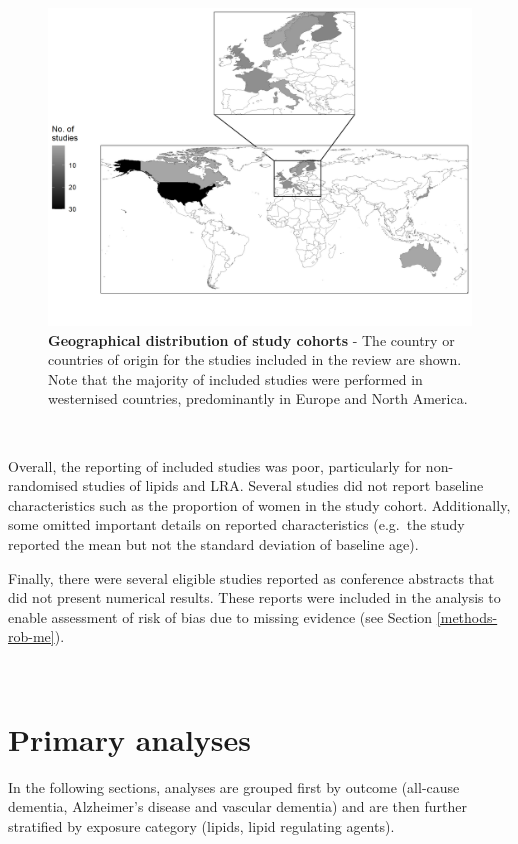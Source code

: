 \documentclass[a4paper, twoside]{templates/ociamthesis}
\begin{document}
\begin{figure}[H]
\includegraphics[width=1\linewidth]{figures/sys-rev/cohortLocations} \caption[Geographical distribution of study cohorts]{\textbf{Geographical distribution of study cohorts} - The country or countries of origin for the studies included in the review are shown. Note that the majority of included studies were performed in westernised countries, predominantly in Europe and North America.}\label{fig:cohortLocations}
\end{figure}

~

Overall, the reporting of included studies was poor, particularly for non-randomised studies of lipids and LRA. Several studies did not report baseline characteristics such as the proportion of women in the study cohort. Additionally, some omitted important details on reported characteristics (e.g.~the study reported the mean but not the standard deviation of baseline age).

Finally, there were several eligible studies reported as conference abstracts that did not present numerical results. These reports were included in the analysis to enable assessment of risk of bias due to missing evidence (see Section \ref{methods-rob-me}).

~

\hypertarget{primary-analyses}{%
\section{Primary analyses}\label{primary-analyses}}

In the following sections, analyses are grouped first by outcome (all-cause dementia, Alzheimer's disease and vascular dementia) and are then further stratified by exposure category (lipids, lipid regulating agents).
\end{document}
